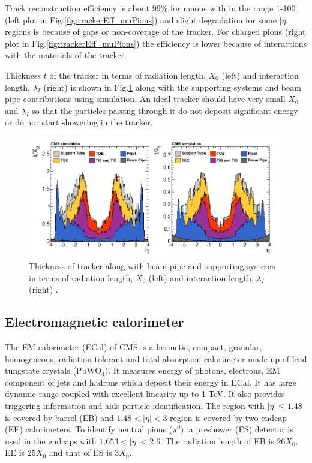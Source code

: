 Track reconstruction efficiency is about 99\% for muons with \pt in the range 1-100 \gev (left plot in Fig.\ref{fig:trackerEff_muPions}) 
and slight degradation for some $|\eta|$ regions is because of gaps or non-coverage of the tracker. For charged pions (right plot in 
Fig.\ref{fig:trackerEff_muPions}) the efficiency is lower because of interactions with the materials of the tracker. 

Thickness $t$ of the 
tracker in terms of radiation length, $X_0$ (left) and interaction length, $\lambda_I$ (right) is shown in Fig.\ref{fig:tracker_material} 
along with the supporting systems and beam pipe contributions using simulation. An ideal tracker should have very small $X_0$ and 
$\lambda_I$ so that the particles passing through it do not deposit significant energy or do not start showering in the tracker.

\begin{figure}[h!]
\centering
\includegraphics[width=0.98\linewidth]{../Figures/Chap2/tracker_material}
\caption[Tracker material budget]{Thickness of tracker along with beam pipe and supporting systems in terms of radiation length, $X_0$ (left) and interaction length, $\lambda_I$ (right) \cite{Collaboration_2014}.}
\label{fig:tracker_material}
\end{figure}

\subsection{Electromagnetic calorimeter}
The EM calorimeter (ECal) of CMS is a hermetic, compact, granular, homogeneous, radiation tolerant and total absorption calorimeter made 
up of lead tungstate crystals (PbWO$_4$). It measures energy of photons, electrons, EM component of jets and hadrons which deposit their 
energy in ECal. It has large dynamic range 
coupled with excellent linearity up to 1 TeV. It also provides triggering information and aids particle identification. The region with 
$|\eta| \leq 1.48$ is covered by barrel (EB) and $1.48 < |\eta| < 3$ region is covered by two endcap (EE) calorimeters. To identify 
neutral pions ($\pi^0$), a preshower (ES) detector is used in the endcaps with $1.653 < |\eta| < 2.6$. The radiation length of EB is 
$26X_0$, EE is $25X_0$ and that of ES is $3X_0$.

